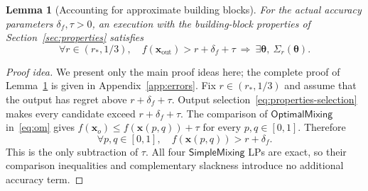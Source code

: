 \documentclass[11pt]{article}
\newtheorem{lemma}[theorem]{Lemma}
\theoremstyle{remark}
\theoremstyle{plain}
\newcommand{\sm}{\mathsf{SimpleMixing}}
\newcommand{\om}{\mathsf{OptimalMixing}}
\begin{document}
\begin{lemma}[Accounting for approximate building blocks]
\label{lem:error-transfer}
For the actual accuracy parameters $\delta_f,\tau>0$, an execution
with the building-block properties of Section~\ref{sec:properties}
satisfies
\[
 \forall r\in(r_*,1/3),\quad
 f(\boldsymbol x_{\mathrm{out}})>r+\delta_f+\tau
 \ \Longrightarrow\ \exists\boldsymbol\theta,\ \Sigma_r(\boldsymbol\theta).
\]
\end{lemma}
\begin{proof}[Proof idea]
We present only the main proof ideas here; the complete proof of
Lemma~\ref{lem:error-transfer} is given in Appendix~\ref{app:errors}.
Fix $r\in(r_*,1/3)$ and assume that the output has regret above
$r+\delta_f+\tau$.
Output selection~\eqref{eq:properties-selection} makes every
candidate exceed $r+\delta_f+\tau$.
The comparison of $\om$ in~\eqref{eq:om} gives
$f(\boldsymbol x_o)\le f(\boldsymbol x(p,q))+\tau$ for every
$p,q\in[0,1]$. Therefore
\begin{equation}
 \forall p,q\in[0,1],\quad
 f(\boldsymbol x(p,q))>r+\delta_f.
 \label{eq:main-error-rectangle-failure}
\end{equation}
This is the only subtraction of $\tau$. All four $\sm$ LPs are
exact, so their comparison inequalities and complementary slackness
introduce no additional accuracy term.


\end{proof}
\end{document}
